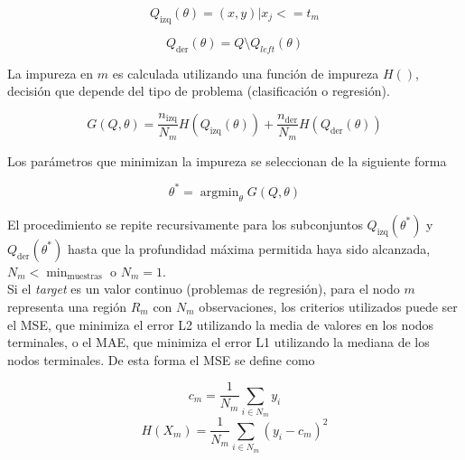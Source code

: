 \documentclass[spanish]{article}
\begin{document}
                \begin{equation}
                    Q_{\text{izq}}(\theta) = (x, y) | x_j <= t_m
                \end{equation}
                
                \begin{equation}
                    Q_{\text{der}}(\theta) = Q \setminus Q_{left}(\theta)
                \end{equation}
                
                
                La impureza en $m$ es calculada utilizando una función de impureza $H()$, decisión que depende del tipo de problema 
                (clasificación o regresión).
    
                \begin{equation}
                    G(Q, \theta) = \frac{n_{\text{izq}}}{N_m} H(Q_{\text{izq}}(\theta)) + \frac{n_{\text{der}}}{N_m} H(Q_{\text{der}}(\theta))
                \end{equation}            
                
                
                Los parámetros que minimizan la impureza se seleccionan de la siguiente forma
                
                \begin{equation}
                    \theta^* = \operatorname{argmin}_\theta  G(Q, \theta)
                \end{equation}
               
                El procedimiento se repite recursivamente para los subconjuntos $Q_{\text{izq}}(\theta^*)$ y $Q_{\text{der}}(\theta^*)$ hasta que 
                la profundidad máxima permitida haya sido alcanzada, $N_m < \min_{\text{muestras}}$ o $N_m = 1$. \\
                
                Si el \emph{target} es un valor continuo (problemas de regresión), para el nodo $m$ representa una región $R_m$ con $N_m$ observaciones, 
                los criterios utilizados puede ser el MSE, que minimiza el error L2 utilizando la media de valores en los nodos terminales, o el
                MAE, que minimiza el error L1 utilizando la mediana de los nodos terminales. De esta forma el MSE se define como
            
                \begin{equation}
                    c_m = \frac{1}{N_m} \sum_{i \in N_m} y_i
                \end{equation}
                \begin{equation}
                    H(X_m) = \frac{1}{N_m} \sum_{i \in N_m} (y_i - c_m)^2
                \end{equation}
                
\end{document}

